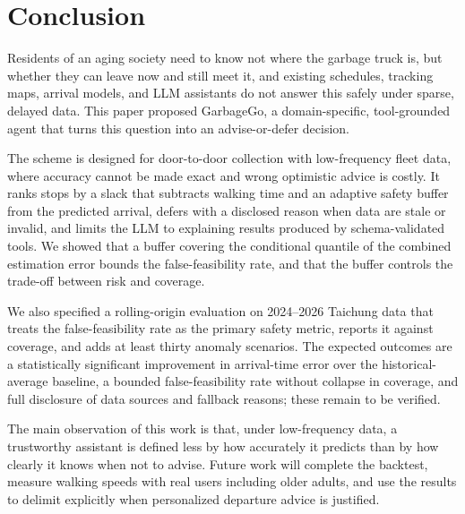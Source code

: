 \section{Conclusion}\label{sec:conclusion}

Residents of an aging society need to know not where the garbage truck is, but whether they can leave now and still meet it, and existing schedules, tracking maps, arrival models, and LLM assistants do not answer this safely under sparse, delayed data. This paper proposed GarbageGo, a domain-specific, tool-grounded agent that turns this question into an advise-or-defer decision.

The scheme is designed for door-to-door collection with low-frequency fleet data, where accuracy cannot be made exact and wrong optimistic advice is costly. It ranks stops by a slack that subtracts walking time and an adaptive safety buffer from the predicted arrival, defers with a disclosed reason when data are stale or invalid, and limits the LLM to explaining results produced by schema-validated tools. We showed that a buffer covering the conditional quantile of the combined estimation error bounds the false-feasibility rate, and that the buffer controls the trade-off between risk and coverage.

We also specified a rolling-origin evaluation on 2024--2026 Taichung data that treats the false-feasibility rate as the primary safety metric, reports it against coverage, and adds at least thirty anomaly scenarios. The expected outcomes are a statistically significant improvement in arrival-time error over the historical-average baseline, a bounded false-feasibility rate without collapse in coverage, and full disclosure of data sources and fallback reasons; these remain to be verified.

The main observation of this work is that, under low-frequency data, a trustworthy assistant is defined less by how accurately it predicts than by how clearly it knows when not to advise. Future work will complete the backtest, measure walking speeds with real users including older adults, and use the results to delimit explicitly when personalized departure advice is justified.
